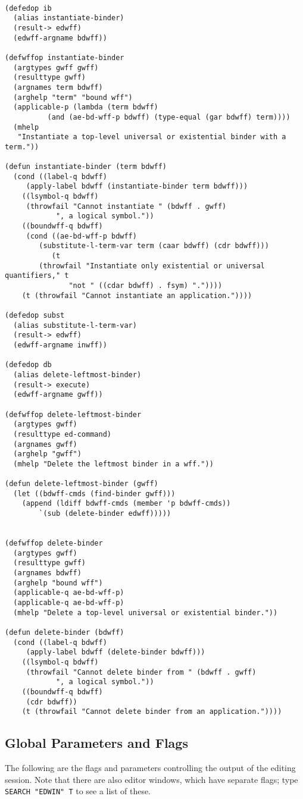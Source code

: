 \begin{verbatim}

(defedop ib
  (alias instantiate-binder)
  (result-> edwff)
  (edwff-argname bdwff))

(defwffop instantiate-binder
  (argtypes gwff gwff)
  (resulttype gwff)
  (argnames term bdwff)
  (arghelp "term" "bound wff")
  (applicable-p (lambda (term bdwff)
		  (and (ae-bd-wff-p bdwff) (type-equal (gar bdwff) term))))
  (mhelp
   "Instantiate a top-level universal or existential binder with a term."))

(defun instantiate-binder (term bdwff)
  (cond ((label-q bdwff)
	 (apply-label bdwff (instantiate-binder term bdwff)))
	((lsymbol-q bdwff)
	 (throwfail "Cannot instantiate " (bdwff . gwff)
		    ", a logical symbol."))
	((boundwff-q bdwff)
	 (cond ((ae-bd-wff-p bdwff)
		(substitute-l-term-var term (caar bdwff) (cdr bdwff)))
	       (t
		(throwfail "Instantiate only existential or universal quantifiers," t
			   "not " ((cdar bdwff) . fsym) "."))))
	(t (throwfail "Cannot instantiate an application."))))

(defedop subst
  (alias substitute-l-term-var)
  (result-> edwff)
  (edwff-argname inwff))

(defedop db
  (alias delete-leftmost-binder)
  (result-> execute)
  (edwff-argname gwff))

(defwffop delete-leftmost-binder
  (argtypes gwff)
  (resulttype ed-command)
  (argnames gwff)
  (arghelp "gwff")
  (mhelp "Delete the leftmost binder in a wff."))

(defun delete-leftmost-binder (gwff)
  (let ((bdwff-cmds (find-binder gwff)))
    (append (ldiff bdwff-cmds (member 'p bdwff-cmds))
	    `(sub (delete-binder edwff)))))


(defwffop delete-binder
  (argtypes gwff)
  (resulttype gwff)
  (argnames bdwff)
  (arghelp "bound wff")
  (applicable-q ae-bd-wff-p)
  (applicable-q ae-bd-wff-p)
  (mhelp "Delete a top-level universal or existential binder."))

(defun delete-binder (bdwff)
  (cond ((label-q bdwff)
	 (apply-label bdwff (delete-binder bdwff)))
	((lsymbol-q bdwff)
	 (throwfail "Cannot delete binder from " (bdwff . gwff)
		    ", a logical symbol."))
	((boundwff-q bdwff)
	 (cdr bdwff))
	(t (throwfail "Cannot delete binder from an application."))))

\end{verbatim}

\subsection{Global Parameters and Flags}
The following are the flags and parameters controlling the output 
of the editing session. Note that there are also editor windows,
which have separate flags; type {\tt SEARCH "EDWIN" T} to see a list of these.

